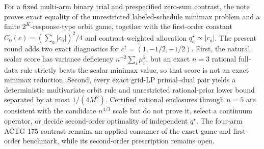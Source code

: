 For a fixed multi-arm binary trial and prespecified zero-sum contrast, the note proves exact equality of the unrestricted labeled-schedule minimax problem and a finite \(2^K\)-response-type orbit game, together with the first-order constant \(C_0(c)=(\sum_a|c_a|)^2/4\) and contrast-weighted allocation \(q_a^\star\propto|c_a|\).  The present round adds two exact diagnostics for \(c^\dagger=(1,-1/2,-1/2)\).  First, the natural scalar score has variance deficiency \(n^{-2}\sum_i\mu_i^2\), but an exact \(n=3\) rational full-data rule strictly beats the scalar minimax value, so that score is not an exact minimax reduction.  Second, every exact grid-LP primal--dual pair yields a deterministic multivariate orbit rule and unrestricted rational-prior lower bound separated by at most \(1/(4M^2)\).  Certified rational enclosures through \(n=5\) are consistent with the candidate \(n^{4/3}\) scale but do not prove it, select a continuum operator, or decide second-order optimality of independent \(q^\star\).  The four-arm ACTG 175 contrast remains an applied consumer of the exact game and first-order benchmark, while its second-order prescription remains open.